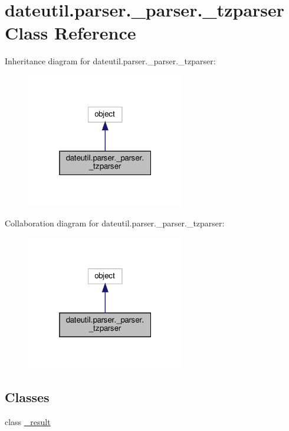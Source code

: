 \hypertarget{classdateutil_1_1parser_1_1__parser_1_1__tzparser}{}\section{dateutil.\+parser.\+\_\+parser.\+\_\+tzparser Class Reference}
\label{classdateutil_1_1parser_1_1__parser_1_1__tzparser}


Inheritance diagram for dateutil.\+parser.\+\_\+parser.\+\_\+tzparser\+:
\nopagebreak
\begin{figure}[H]
\begin{center}
\leavevmode
\includegraphics[width=196pt]{classdateutil_1_1parser_1_1__parser_1_1__tzparser__inherit__graph}
\end{center}
\end{figure}


Collaboration diagram for dateutil.\+parser.\+\_\+parser.\+\_\+tzparser\+:
\nopagebreak
\begin{figure}[H]
\begin{center}
\leavevmode
\includegraphics[width=196pt]{classdateutil_1_1parser_1_1__parser_1_1__tzparser__coll__graph}
\end{center}
\end{figure}
\subsection*{Classes}
\begin{DoxyCompactItemize}
\item 
class \hyperlink{classdateutil_1_1parser_1_1__parser_1_1__tzparser_1_1__result}{\+\_\+result}
\end{DoxyCompactItemize}
